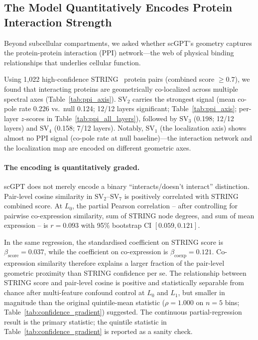 \documentclass[12pt]{article}
\newcommand{\SV}[1]{\mathrm{SV}_{#1}}
\begin{document}
\subsection{The Model Quantitatively Encodes Protein Interaction Strength}
\label{sec:ppi}

Beyond subcellular compartments, we asked whether scGPT's geometry captures the protein-protein interaction (PPI) network---the web of physical binding relationships that underlies cellular function.

Using 1{,}022 high-confidence STRING~\cite{szklarczyk2023string} protein pairs (combined score $\geq 0.7$), we found that interacting proteins are geometrically co-localized across multiple spectral axes (Table~\ref{tab:ppi_axis}).
$\SV{2}$ carries the strongest signal (mean co-pole rate 0.226 vs.\ null 0.124; 12/12 layers significant; Table~\ref{tab:ppi_axis}; per-layer $z$-scores in Table~\ref{tab:ppi_all_layers}), followed by $\SV{3}$ (0.198; 12/12 layers) and $\SV{4}$ (0.158; 7/12 layers).
Notably, $\SV{1}$ (the localization axis) shows almost no PPI signal (co-pole rate at null baseline)---the interaction network and the localization map are encoded on different geometric axes.

\paragraph{The encoding is quantitatively graded.}
scGPT does not merely encode a binary ``interacts/doesn't interact'' distinction.
Pair-level cosine similarity in $\SV{2}$--$\SV{7}$ is positively correlated with STRING combined score.
At $L_0$, the partial Pearson correlation -- after controlling for pairwise co-expression similarity, sum of STRING node degrees, and sum of mean expression -- is $r = 0.093$ with 95\% bootstrap CI $[0.059, 0.121]$.

In the same regression, the standardised coefficient on STRING score is $\beta_\text{score} = 0.037$, while the coefficient on co-expression is $\beta_\text{coexp} = 0.121$.
Co-expression similarity therefore explains a larger fraction of the pair-level geometric proximity than STRING confidence per se.
The relationship between STRING score and pair-level cosine is positive and statistically separable from chance after multi-feature confound control at $L_0$ and $L_1$, but smaller in magnitude than the original quintile-mean statistic ($\rho = 1.000$ on $n=5$ bins; Table~\ref{tab:confidence_gradient}) suggested.
The continuous partial-regression result is the primary statistic; the quintile statistic in Table~\ref{tab:confidence_gradient} is reported as a sanity check.
\end{document}
